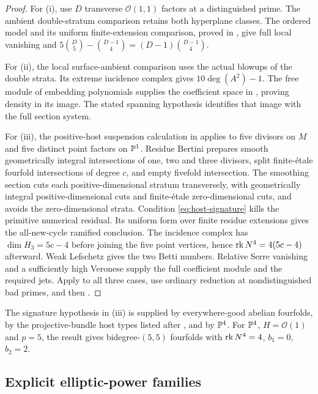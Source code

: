 \begin{proof}
For (i), use $D$ transverse $\mathcal O(1,1)$ factors at a
distinguished prime. The ambient double-stratum comparison retains
both hyperplane classes. The ordered model and its uniform
finite-extension comparison, proved in \cite{InternalDense}, give
full local vanishing and
$5\binom D5-\binom{D-1}4=(D-1)\binom{D-1}4$.

For (ii), the local surface-ambient comparison uses the actual
blowups of the double strata. Its extreme incidence complex gives
$10\deg(A^2)-1$. The free module of embedding polynomials supplies
the coefficient space in , proving
density in its image. The stated spanning hypothesis identifies
that image with the full section system.

For (iii), the positive-host suspension calculation in
\cite{InternalPositiveHosts} applies to five divisors on $M$
and five distinct point factors on $\mathbb P^1$. Residue Bertini
prepares smooth geometrically integral intersections of one,
two and three divisors, split finite-\'etale fourfold intersections
of degree $c$, and empty fivefold intersection. The smoothing
section cuts each positive-dimensional stratum transversely,
with geometrically integral positive-dimensional cuts and
finite-\'etale zero-dimensional cuts, and avoids the
zero-dimensional strata. Condition \eqref{eq:host-signature} kills
the primitive numerical residual. Its uniform form over finite
residue extensions gives the all-new-cycle ramified conclusion.
The incidence complex has $\dim H_3=5c-4$ before joining the
five point vertices, hence $\operatorname{rk} N^4=4(5c-4)$ afterward.
Weak Lefschetz gives the two Betti numbers. Relative Serre
vanishing and a sufficiently high Veronese supply the full
coefficient module and the required jets. Apply
 to all three cases, use ordinary
reduction at nondistinguished bad primes, and then
.
\end{proof}

The signature hypothesis in (iii) is supplied by everywhere-good
abelian fourfolds, by the projective-bundle host types listed after
, and by $\mathbb P^4$. For $\mathbb P^4$,
$H=\mathcal O(1)$ and $p=5$, the result gives bidegree-$(5,5)$
fourfolds with $\operatorname{rk} N^4=4$, $b_1=0$, $b_2=2$.

\subsection{Explicit elliptic-power families}

